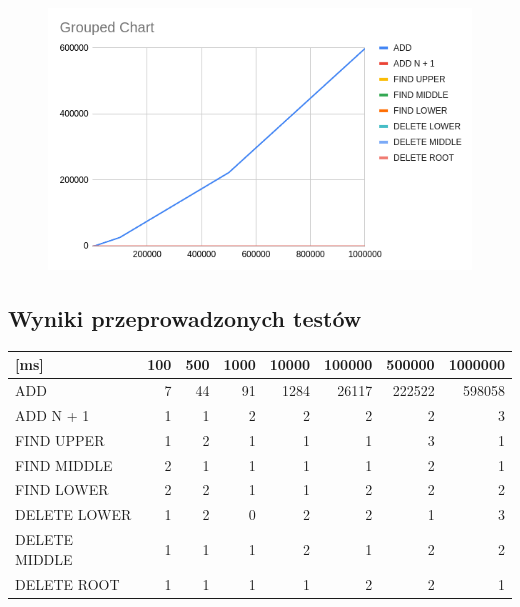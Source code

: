 \documentclass{article}
\begin{document}
\begin{figure}[H]
    \centering
    \includegraphics[width=\textwidth]{"../assets/4_9.png"}    
    \label{fig:4_9}

\end{figure}

\subsection*{Wyniki przeprowadzonych testów}

\begin{table}[H]
    \begin{tabular}{|l|r|r|r|r|r|r|r|}
    \hline
    {[}ms{]}      & 100 & 500 & 1000 & 10000 & 100000 & 500000 & 1000000 \\ \hline
    ADD           & 7   & 44  & 91   & 1284  & 26117  & 222522 & 598058  \\ \hline
    ADD N + 1     & 1   & 1   & 2    & 2     & 2      & 2      & 3       \\ \hline
    FIND UPPER    & 1   & 2   & 1    & 1     & 1      & 3      & 1       \\ \hline
    FIND MIDDLE   & 2   & 1   & 1    & 1     & 1      & 2      & 1       \\ \hline
    FIND LOWER    & 2   & 2   & 1    & 1     & 2      & 2      & 2       \\ \hline
    DELETE LOWER  & 1   & 2   & 0    & 2     & 2      & 1      & 3       \\ \hline
    DELETE MIDDLE & 1   & 1   & 1    & 2     & 1      & 2      & 2       \\ \hline
    DELETE ROOT   & 1   & 1   & 1    & 1     & 2      & 2      & 1       \\ \hline
    \end{tabular}
    \end{table}
\end{document}
